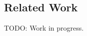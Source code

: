 \documentclass[a4paper,twoside]{article}
\begin{document}
\subsection{Related Work}

TODO: Work in progress.






\end{document}
